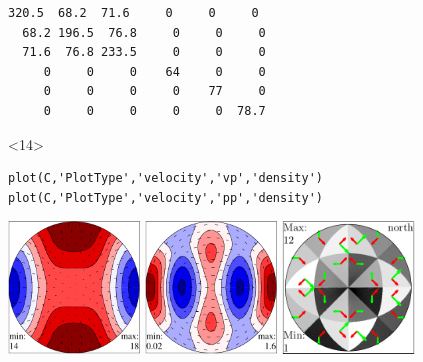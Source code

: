 \documentclass[comptress]{beamer}
\begin{document}
\begin{frame}[fragile]
\begin{overlayarea}{\textwidth}{5.5cm}
\begin{onlyenv}
\begin{lstlisting}[style=output]
 320.5  68.2  71.6     0     0     0
  68.2 196.5  76.8     0     0     0
  71.6  76.8 233.5     0     0     0
     0     0     0    64     0     0
     0     0     0     0    77     0
     0     0     0     0     0  78.7
    \end{lstlisting}
\end{onlyenv}
\begin{onlyenv}<14>
  \begin{lstlisting}[style=input]
plot(C,'PlotType','velocity','vp','density')
plot(C,'PlotType','velocity','pp','density')
  \end{lstlisting}
  \centerline{
  \includegraphics[height=3.5cm]{pic/vp-pp}
  \quad
  \includegraphics[height=3.5cm]{pic/vs12-ps1}
  \quad
  \includegraphics[height=3.5cm]{pic/activeSlip}
  }
\end{onlyenv}


\end{overlayarea}




\end{frame}



\end{document}
